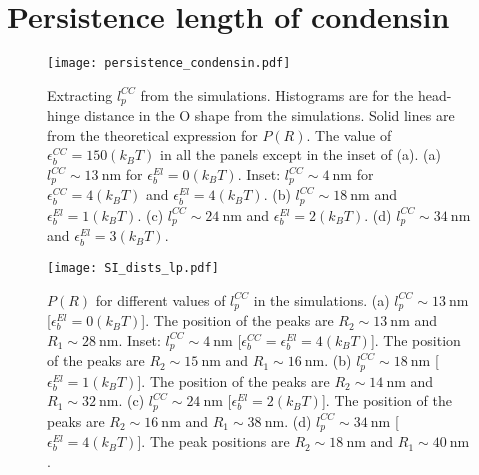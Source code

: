 \documentclass[aps,preprint]{revtex4-1}
\newcommand{\nm}{\ \mathrm{nm}}
\begin{document}
\section{Persistence length of condensin}
\begin{figure}[]
\centering
\texttt{[image: persistence\_condensin.pdf]}
\caption{\label{fig:persistence} Extracting $l_p^{CC}$ from the simulations. Histograms are for the head-hinge distance in the O shape from the  simulations. Solid lines are from the theoretical expression for $P(R)$. The value of $\epsilon^{CC}_b=150 (k_BT)$ in all the panels except in the inset of (a). (a) $l_p^{CC}\sim13\nm$ for $\epsilon^{El}_b=0 (k_BT)$.  Inset: $l_p^{CC}\sim4\nm$ for $\epsilon^{CC}_b=4 (k_BT)$ and $\epsilon^{El}_b=4 (k_BT)$. (b) $l_p^{CC}\sim18\nm$ and $\epsilon^{El}_b=1 (k_BT)$. (c) $l_p^{CC}\sim24\nm$  and $\epsilon^{El}_b=2 (k_BT)$. (d) $l_p^{CC}\sim34\nm$  and $\epsilon^{El}_b=3 (k_BT)$. 
}
\end{figure}

\begin{figure}[]
\centering
\texttt{[image: SI\_dists\_lp.pdf]}
\caption{\label{fig:dists_lp} $P(R)$ for different values of $l_p^{CC}$ in the simulations. (a) $l_p^{CC}\sim13\nm$ [$\epsilon^{El}_b=0 (k_BT)$]. The position of the peaks are $R_2 \sim 13 \nm$ and $R_1 \sim 28 \nm$.  Inset: $l_p^{CC}\sim4\nm$ [$\epsilon^{CC}_b=\epsilon^{El}_b=4 (k_BT)$].  The position of the peaks are $R_2 \sim 15 \nm$ and $R_1 \sim 16 \nm$. (b)  $l_p^{CC}\sim 18\nm$ [$\epsilon^{El}_b=1 (k_BT)$]. The position of the peaks are $R_2 \sim 14 \nm$ and $R_1 \sim 32 \nm$.  (c) $l_p^{CC}\sim24\nm$ [$\epsilon^{El}_b=2 (k_BT)$]. The position of the peaks are $R_2 \sim 16 \nm$ and $R_1\sim 38 \nm$.  (d)  $l_p^{CC}\sim34\nm$ [$\epsilon^{El}_b=4 (k_BT)$]. The peak positions are $R_2 \sim 18 \nm$ and $R_1\sim 40 \nm$. 
}
\end{figure}
\end{document}
